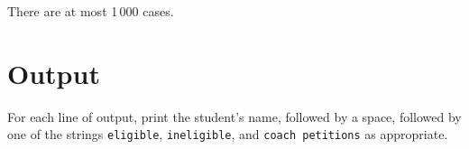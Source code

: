 There are at most 1\,000 cases.

\section*{Output}

For each line of output, print the student's name, followed by a space, followed
by one of the strings \verb|eligible|, \verb|ineligible|, and \verb|coach petitions|
as appropriate.
